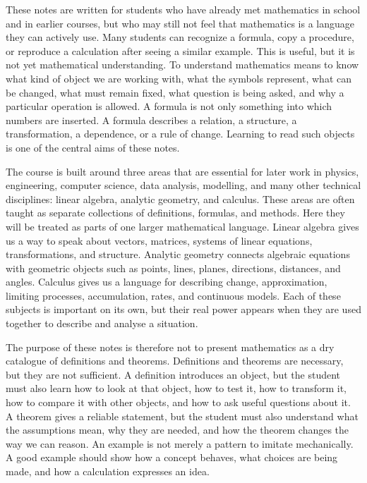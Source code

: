 These notes are written for students who have already met mathematics in school and in earlier courses, but who may still not feel that mathematics is a language they can actively use. Many students can recognize a formula, copy a procedure, or reproduce a calculation after seeing a similar example. This is useful, but it is not yet mathematical understanding. To understand mathematics means to know what kind of object we are working with, what the symbols represent, what can be changed, what must remain fixed, what question is being asked, and why a particular operation is allowed. A formula is not only something into which numbers are inserted. A formula describes a relation, a structure, a transformation, a dependence, or a rule of change. Learning to read such objects is one of the central aims of these notes.

The course is built around three areas that are essential for later work in physics, engineering, computer science, data analysis, modelling, and many other technical disciplines: linear algebra, analytic geometry, and calculus. These areas are often taught as separate collections of definitions, formulas, and methods. Here they will be treated as parts of one larger mathematical language. Linear algebra gives us a way to speak about vectors, matrices, systems of linear equations, transformations, and structure. Analytic geometry connects algebraic equations with geometric objects such as points, lines, planes, directions, distances, and angles. Calculus gives us a language for describing change, approximation, limiting processes, accumulation, rates, and continuous models. Each of these subjects is important on its own, but their real power appears when they are used together to describe and analyse a situation.

The purpose of these notes is therefore not to present mathematics as a dry catalogue of definitions and theorems. Definitions and theorems are necessary, but they are not sufficient. A definition introduces an object, but the student must also learn how to look at that object, how to test it, how to transform it, how to compare it with other objects, and how to ask useful questions about it. A theorem gives a reliable statement, but the student must also understand what the assumptions mean, why they are needed, and how the theorem changes the way we can reason. An example is not merely a pattern to imitate mechanically. A good example should show how a concept behaves, what choices are being made, and how a calculation expresses an idea.

